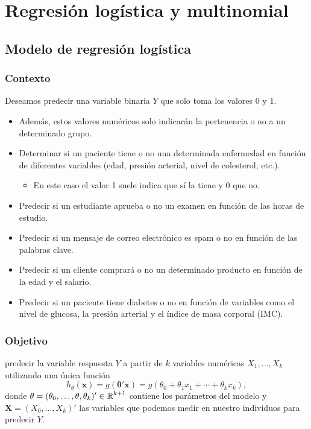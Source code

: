 \section{Regresión logística y multinomial}
\subsection{Modelo de regresión logística}
\subsubsection{Contexto}
Deseamos predecir una variable binaria $Y$ que solo toma los valores 0 y 1.
\begin{itemize}
	\item Además, estos valores numéricos solo indicarán la pertenencia o no a un determinado grupo.
\end{itemize}
\begin{itemize}
	\item Determinar si un paciente tiene o no una determinada enfermedad en función de diferentes variables (edad, presión arterial, nivel de colesterol, etc.).
	\begin{itemize}
		\item En este caso el valor 1 suele indica que sí la tiene y 0 que no.
	\end{itemize}
	\item Predecir si un estudiante aprueba o no un examen en función de las horas de estudio.
	\item Predecir si un mensaje de correo electrónico es spam o no en función de las palabras clave.
	\item Predecir si un cliente comprará o no un determinado producto en función de la edad y el salario.
	\item Predecir si un paciente tiene diabetes o no en función de variables como el nivel de glucosa, la presión arterial y el índice de masa corporal (IMC).
\end{itemize}
\subsubsection{Objetivo}
 predecir la variable respuesta $Y$ a partir de $k$ variables numéricas $X_1,\dots,X_k$ utilizando una única función \[ h_\theta(\mathbf{x})=g(\mathbf{\theta'x})=g(\theta_0+\theta_1x_1+\cdots+\theta_kx_k), \]donde $\mathbf{\theta}=(\theta_0,\dots,\theta,\theta_k)'\in\operatorname{\mathbb{R}}^{k+1}$ contiene los parámetros del modelo y $\mathbf{X}=(X_0,\dots,X_k)'$ las variables que podemos medir en nuestro individuos para predecir $Y$.

